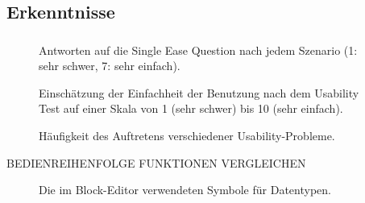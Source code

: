 \subsection{Erkenntnisse}
\begin{frame}
  \frametitle{\currentsectionname}

  \begin{figure}
    
    \caption{Antworten auf die Single Ease Question nach jedem Szenario (1: sehr schwer, 7: sehr einfach).}
  \end{figure}

  \note{
    \begin{itemize}
    \end{itemize}
  }

\end{frame}

\begin{frame}

  \begin{figure}
    
    \caption{Einschätzung der Einfachheit der Benutzung nach dem Usability Test auf einer Skala von 1 (sehr schwer) bis 10 (sehr einfach).}
  \end{figure}

\end{frame}

\begin{frame}

  \begin{figure}
    
    \caption{Häufigkeit des Auftretens verschiedener Usability-Probleme.}
  \end{figure}

\end{frame}

\begin{frame}

  BEDIENREIHENFOLGE FUNKTIONEN VERGLEICHEN

\end{frame}

\begin{frame}

  \begin{figure}
    
    \caption{Die im Block-Editor verwendeten Symbole für Datentypen.}
  \end{figure}

\end{frame}

